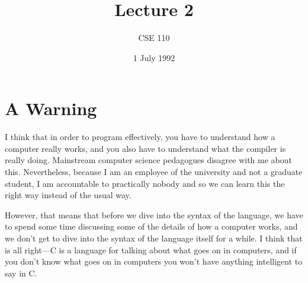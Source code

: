 %
%
%


\def\brac#1{$<$#1$>$}
\def\Int{{\tt int}}
\def\int{\brac{\Int}}
\def\int{\brac{\Int}}
\def\Shortint{{\tt short~int}}
\def\shortint{\brac{\Shortint}}
\def\Longint{{\tt long~int}}
\def\longint{\brac{\Longint}}
\def\Float{{\tt float}}
\def\float{\brac{\Float}}
\def\Double{{\tt double}}
\def\double{\brac{\Double}}
\def\Char{{\tt char}}
\def\char{\brac{\Char}}
\def\Void{{\tt void}}
\def\void{\brac{\Void}}

\def\p2#1{\brac{pointer~to #1}}

\parskip 8pt

\title{Lecture 2}
\author{CSE 110}
\date{1 July 1992}

\pagestyle{fancy}
\rhead{\thepage}
\cfoot{}




\maketitle

\section{A Warning}

    I think that in order to program effectively, you have to understand
how a computer really works, and you also have to understand what the
compiler is really doing.  Mainstream computer science pedagogues
disagree with me about this.  Nevertheless, because I am an employee of
the university and not a graduate student, I am accountable to
practically nobody and so we can learn this the right way instead of the
usual way.

    However, that means that before we dive into the syntax of the
language, we have to spend some time discussing some of the details of
how a computer works, and we don't get to dive into the syntax of the
language itself for a while.  I think that is all right---C is a
language for talking about what goes on in computers, and if you don't
know what goes on in computers you won't have anything intelligent to
say in C.

